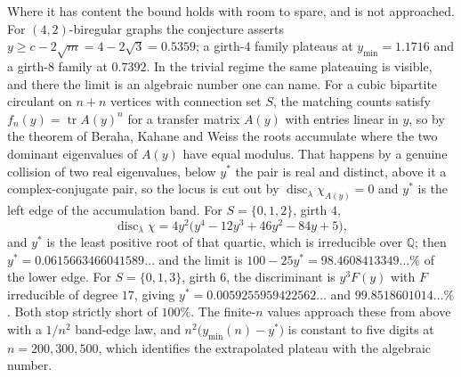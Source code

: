 \documentclass[11pt]{article}
\theoremstyle{remark}
\begin{document}
Where it has content the bound holds with room to spare, and is not approached.
For $(4,2)$-biregular graphs the conjecture asserts $y\ge c-2\sqrt m=4-2\sqrt3
=0.5359$; a girth-$4$ family plateaus at $y_{\min}=1.1716$ and a girth-$8$ family
at $0.7392$. In the trivial regime the same plateauing is visible, and there
the limit is an algebraic number one can name. For a cubic bipartite circulant on
$n+n$ vertices with connection set $S$, the matching counts satisfy
$f_n(y)=\operatorname{tr}A(y)^n$ for a transfer matrix $A(y)$ with entries linear
in $y$, so by the theorem of Beraha, Kahane and Weiss the roots accumulate where
the two dominant eigenvalues of $A(y)$ have equal modulus. That happens by a
genuine collision of two real eigenvalues, below $y^*$ the pair is real and
distinct, above it a complex-conjugate pair, so the locus is cut out by
$\operatorname{disc}_\lambda\chi_{A(y)}=0$ and $y^*$ is the left edge of the
accumulation band. For $S=\{0,1,2\}$, girth $4$,
\[
\operatorname{disc}_\lambda\chi=4y^2\bigl(y^4-12y^3+46y^2-84y+5\bigr),
\]
and $y^*$ is the least positive root of that quartic, which is irreducible over
$\mathbb Q$; then $y^*=0.0615663466041589\ldots$ and the limit is
$100-25y^*=98.4608413349\ldots\%$ of the lower edge. For $S=\{0,1,3\}$, girth
$6$, the discriminant is $y^3F(y)$ with $F$ irreducible of degree $17$, giving
$y^*=0.0059255959422562\ldots$ and $99.8518601014\ldots\%$. Both stop strictly
short of $100\%$. The finite-$n$ values approach these from above with a $1/n^2$
band-edge law, and $n^2\bigl(y_{\min}(n)-y^*\bigr)$ is constant to five digits at
$n=200,300,500$, which identifies the extrapolated plateau with the algebraic
number.
\end{document}
